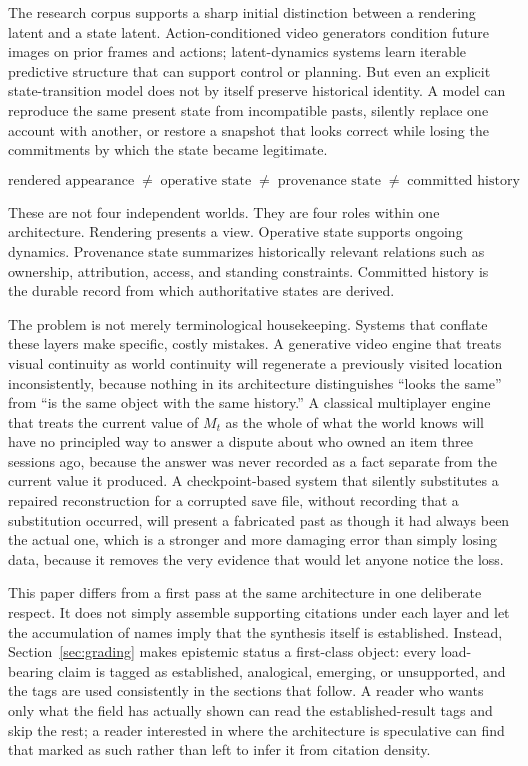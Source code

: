 \documentclass[11pt]{article}
\begin{document}
The research corpus supports a sharp initial distinction between a rendering latent and a state latent. Action-conditioned video generators condition future images on prior frames and actions; latent-dynamics systems learn iterable predictive structure that can support control or planning. But even an explicit state-transition model does not by itself preserve historical identity. A model can reproduce the same present state from incompatible pasts, silently replace one account with another, or restore a snapshot that looks correct while losing the commitments by which the state became legitimate.

\[
\text{rendered appearance} \;\neq\; \text{operative state} \;\neq\; \text{provenance state} \;\neq\; \text{committed history}
\]

These are not four independent worlds. They are four roles within one architecture. Rendering presents a view. Operative state supports ongoing dynamics. Provenance state summarizes historically relevant relations such as ownership, attribution, access, and standing constraints. Committed history is the durable record from which authoritative states are derived.

The problem is not merely terminological housekeeping. Systems that conflate these layers make specific, costly mistakes. A generative video engine that treats visual continuity as world continuity will regenerate a previously visited location inconsistently, because nothing in its architecture distinguishes ``looks the same'' from ``is the same object with the same history.'' A classical multiplayer engine that treats the current value of $M_t$ as the whole of what the world knows will have no principled way to answer a dispute about who owned an item three sessions ago, because the answer was never recorded as a fact separate from the current value it produced. A checkpoint-based system that silently substitutes a repaired reconstruction for a corrupted save file, without recording that a substitution occurred, will present a fabricated past as though it had always been the actual one, which is a stronger and more damaging error than simply losing data, because it removes the very evidence that would let anyone notice the loss.

This paper differs from a first pass at the same architecture in one deliberate respect. It does not simply assemble supporting citations under each layer and let the accumulation of names imply that the synthesis itself is established. Instead, Section~\ref{sec:grading} makes epistemic status a first-class object: every load-bearing claim is tagged as established, analogical, emerging, or unsupported, and the tags are used consistently in the sections that follow. A reader who wants only what the field has actually shown can read the established-result tags and skip the rest; a reader interested in where the architecture is speculative can find that marked as such rather than left to infer it from citation density.
\end{document}
